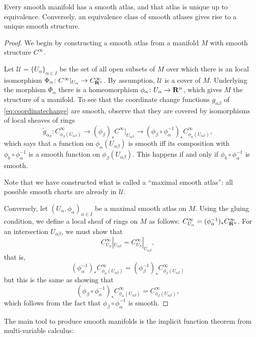 \documentclass[a4paper,openany]{scrbook}
\begin{document}
\begin{thm}
Every smooth manifold has a smooth atlas, and that atlas is unique up to equivalence. Conversely, an equivalence class of smooth atlases gives rise to a unique smooth structure.
\end{thm}
\begin{proof}
We begin by constructing a smooth atlas from a manifold $M$ with smooth structure $C^\infty$.

Let $\mathcal U = \{U_\alpha\}_{\alpha \in I}$ be the set of all open subsets of $M$ over which there is an local isomorphism $\Phi_\alpha\colon C^\infty|_{U_\alpha} \to C^\infty_{\mathbf R^{n}}$. By assumption, $\mathcal U$ is a cover of $M$. Underlying the morphism $\Phi_\alpha$ there is a homeomorphism $\phi_\alpha\colon U_\alpha \to \mathbf R^{n}$, which gives $M$ the structure of a manifold. To see that the coordinate change functions $g_{\alpha\beta}$ of \eqref{eq:coordinatechange} are smooth, observe that they are covered by isomorphisms of local sheaves of rings
\[
\tilde g_{\alpha_\beta}\colon C^\infty_{\phi_\beta(U_{\alpha\beta})} \to (\phi_\beta)_* C^\infty|_{U_{\alpha\beta}} \to (\phi_\beta \circ \phi_\alpha^{-1})_*C^\infty_{\phi_\alpha(U_{\alpha\beta})},
\]
which says that a function on $\phi_{\alpha}(U_{\alpha\beta})$ is smooth iff its composition with $\phi_b\circ\phi_\alpha^{-1}$ is a smooth function on $\phi_\beta(U_{\alpha\beta})$. This happens if and only if $\phi_b\circ\phi_\alpha^{-1}$ is smooth.

Note that we have constructed what is called a ``maximal smooth atlas'': all possible smooth charts are already in $\mathcal U$.

Conversely, let $(U_\alpha,\phi_\alpha)_{\alpha \in I}$ be a maximal smooth atlas on $M$. Using the gluing condition, we define a local sheaf of rings on $M$ as follows: $C^\infty_{U_\alpha} = (\phi_\alpha^{-1})_* C^\infty_{\mathbf R^{n}}$. For an intersection $U_{\alpha\beta}$, we must show that 
\[
C^\infty_{U_\alpha}|_{U_{\alpha\beta}} = C^\infty_{U_\beta}|_{U_{\alpha\beta}},
\]
that is,
\[
(\phi_\alpha^{-1})_* C^\infty_{\phi_\alpha(U_{\alpha\beta})} = (\phi_\beta^{-1})_* C^\infty_{\phi_\beta(U_{\alpha\beta})}
\]
but this is the same as showing that
\[
(\phi_\beta\circ\phi_\alpha^{-1})_*C^\infty_{\phi_\alpha(U_{\alpha\beta})} = C^\infty_{\phi_\beta(U_{\alpha\beta})},
\]
which follows from the fact that $\phi_\beta\circ\phi_\alpha^{-1}$ is smooth.
\end{proof}

The main tool to produce smooth manifolds is the implicit function theorem from multi-variable calculus:
\end{document}

